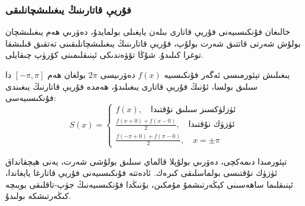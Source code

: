 \subsubsection{فۇريې قاتارىنىڭ يىغىلىشچانلىقى}
خالىغان فۇنكىسىيەنى فۇريې قاتارى بىلەن يايغىلى بولمايدۇ، دەۋرىي ھەم يىغىلىشچان بولۇش شەرتى قاتتىق شەرت بولۇپ، فۇريې قاتارىنىڭ يىغىلىشچانلىقىنى تەتقىق قىلىشقا توغرا كىلىدۇ. شۇڭا تۆۋەندىكى ئېنىقلىمىنى كۆرۈپ چىقايلى.
\begin{MyTheorem}{يىغىلىش تېئورمىسى}{}%
ئەگەر فۇنكىسىيە $f(x)$ دەۋرىيسى  $2\pi$ بولغان ھەم $[-\pi,\pi]$ دا سىلىق بولسا، ئۇنىڭ فۇريې قاتارى يىغىلىدۇ، ھەمدە فۇريې قاتارنىڭ يىغىندى فۇنكىسىيەسى:
$$ S(x) = 
\begin{cases}
f(x),\quad \text{ئۈزلۈكسىز سىلىق نۇقتىدا} \\
\frac{f(x+0)+f(x-0)}{2}, \quad \text{ئۈزۈك نۇقتىدا} \\
\frac{f(-\pi+0)+f(\pi-0)}{2}, \quad x = \pm\pi
\end{cases}
$$
\end{MyTheorem}
تېئورمىدا دىمەكچى، دەۋرىي بولۇپلا قالماي سىلىق بولۇشى شەرت، يەنى ھېچقانداق ئۈزۈك نۇقتىسى بولماسلىقى كىرەك. ئادەتتە فۇنكىسىيەنى فۇريې قاتارغا يايغاندا، ئېنىقلىما ساھەسىنى كېڭەرتىشمۇ مۇمكىن، بۇنىڭدا فۇنكىسىيەنىڭ جۈپ-تاقلىقى بويىچە كىڭەرتىشكە بولىدۇ.
 
